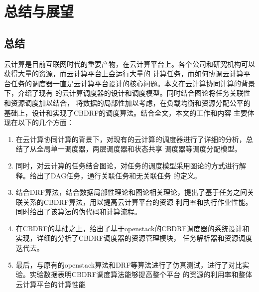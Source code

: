 

\chapter{总结与展望}
\label{cha:conclusions}
\section{总结}
云计算是目前互联网时代的重要产物，在云计算平台上。各个公司和研究机构可以获得大量的资源，而云计算平台上会运行大量的
计算任务，而如何协调云计算平台任务的调度器一直是云计算平台设计的核心问题。本文在云计算协同计算的背景下，介绍了现有
的云计算调度器的设计和调度模型。同时结合图论将任务关联性和资源调度加以结合，
将数据的局部性加以考虑，在负载均衡和资源分配公平的基础上，设计和实现了CBDRF的调度算法。结合全文，本文的工作和内容
主要体现在以下的几个方面：
\begin{enumerate}
\item 在云计算协同计算的背景下，对现有的云计算的调度器进行了详细的分析，总结了从全局单一调度器，两层调度器和状态共享
调度器等调度分配模型。
\item 同时，对云计算的任务结合图论，对任务的调度模型采用图论的方式进行解释。给出了DAG任务，通行关联任务和无关联任务
的定义。
\item 结合DRF算法，结合数据局部性理论和图论相关理论，提出了基于任务之间关联关系的CBDRF算法，用以提高云计算平台的资源
利用率和执行作业性能。同时给出了该算法的伪代码和计算流程。
\item 在CBDRF的基础之上，给出了基于openstack的CBDRF调度器的系统设计和实现，详细的分析了CBDRF调度器的资源管理模块，
任务解析器和资源调度迭代去。
\item 最后，与原有的openstack算法和DRF等算法进行了仿真测试，进行了对比实验。实验数据表明CBDRF调度算法能够提高整个平台
的资源的利用率和整体云计算平台的计算性能
\end{enumerate}

